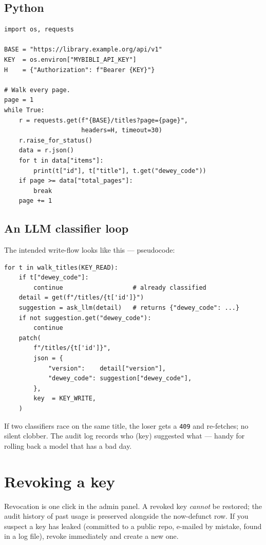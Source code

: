 \subsection{Python}

\begin{verbatim}
import os, requests

BASE = "https://library.example.org/api/v1"
KEY  = os.environ["MYBIBLI_API_KEY"]
H    = {"Authorization": f"Bearer {KEY}"}

# Walk every page.
page = 1
while True:
    r = requests.get(f"{BASE}/titles?page={page}",
                     headers=H, timeout=30)
    r.raise_for_status()
    data = r.json()
    for t in data["items"]:
        print(t["id"], t["title"], t.get("dewey_code"))
    if page >= data["total_pages"]:
        break
    page += 1
\end{verbatim}

\subsection{An LLM classifier loop}

The intended write-flow looks like this — pseudocode:

\begin{verbatim}
for t in walk_titles(KEY_READ):
    if t["dewey_code"]:
        continue                   # already classified
    detail = get(f"/titles/{t['id']}")
    suggestion = ask_llm(detail)   # returns {"dewey_code": ...}
    if not suggestion.get("dewey_code"):
        continue
    patch(
        f"/titles/{t['id']}",
        json = {
            "version":    detail["version"],
            "dewey_code": suggestion["dewey_code"],
        },
        key  = KEY_WRITE,
    )
\end{verbatim}

If two classifiers race on the same title, the loser gets a
\texttt{409} and re-fetches; no silent clobber. The audit log
records who (key) suggested what — handy for rolling back a
model that has a bad day.

\section{Revoking a key}

Revocation is one click in the admin panel. A revoked key
\emph{cannot} be restored; the audit history of past usage is
preserved alongside the now-defunct row. If you suspect a key has
leaked (committed to a public repo, e-mailed by mistake, found in a
log file), revoke immediately and create a new one.

